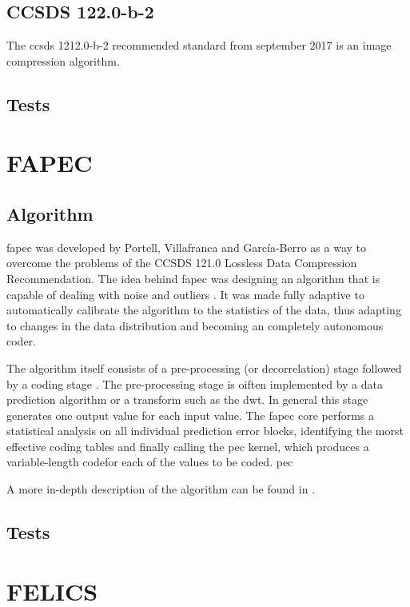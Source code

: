 \subsection{CCSDS 122.0-b-2}
The \gls{ccsds} 1212.0-b-2 recommended standard from september 2017 \cite{ccsds_secreteriat_image_2017} is an image compression algorithm.

\subsection{Tests}


\section{FAPEC}
\subsection{Algorithm}
\gls{fapec} was developed by Portell, Villafranca and Garc\'{i}a-Berro \cite{portell_fapec_2018} as a way to overcome the problems of the CCSDS 121.0 Lossless Data Compression Recommendation. The idea behind \gls{fapec} was designing an algorithm that is capable of dealing with noise and outliers \cite{villafranca_fapec_2011}. It was made fully adaptive to automatically calibrate the algorithm to the statistics of the data, thus adapting to changes in the data distribution and becoming an completely autonomous coder.

The algorithm itself consists of a pre-processing (or decorrelation) stage followed by a coding stage \cite{portell_fapec_2018}. The pre-processing stage is oiften implemented by a data prediction algorithm or a transform such as the \gls{dwt}. In general this stage generates one output value for each input value. 
The \gls{fapec} core performs a statistical analysis on all individual prediction error blocks, identifying the morst effective coding tables and finally calling the \gls{pec} kernel, which produces a variable-length codefor each of the values to be coded. \gls{pec}

A more in-depth description of the algorithm can be found in \cite{portell_fapec_2018,villafranca_prediction_2013,villafranca_fapec_2011}.


\subsection{Tests}

\section{FELICS}
